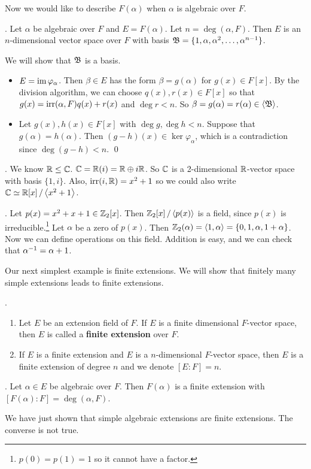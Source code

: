 Now we would like to describe \(F(\alpha)\) when \(\alpha\) is algebraic over \(F\).

\thm. Let \(\alpha\) be algebraic over \(F\) and \(E = F(\alpha)\). Let \(n = \deg(\alpha, F)\). Then \(E\) is an \(n\)-dimensional vector space over \(F\) with basis \(\mathfrak{B} = \{1, \alpha, \alpha^2, \dots, \alpha^{n-1}\}\).

\pf We will show that \(\mathfrak{B}\) is a basis.
\begin{itemize}
    \item {} \(E = \operatorname{im} \varphi_\alpha\). Then \(\beta \in E\) has the form \(\beta = g(\alpha)\) for \(g(x) \in F[x]\). By the division algorithm, we can choose \(q(x), r(x) \in F[x]\) so that \(g(x) = \mathrm{irr}(\alpha, F) q(x) + r(x)\) and \(\deg r < n\). So \(\beta = g(\alpha) = r(\alpha) \in \left\langle \mathfrak{B} \right\rangle\).
    \item {} Let \(g(x), h(x) \in F[x]\) with \(\deg g, \deg h < n\). Suppose that \(g(\alpha) = h(\alpha)\). Then \((g-h)(x) \in \ker \varphi_\alpha\), which is a contradiction since \(\deg (g-h) < n\). \qed
\end{itemize}

\pagebreak

\ex. We know \(\mathbb{R} \leq \mathbb{C}\). \(\mathbb{C} = \mathbb{R}(i) = \mathbb{R} \oplus i\mathbb{R}\). So \(\mathbb{C}\) is a 2-dimensional \(\mathbb{R}\)-vector space with basis \(\{1, i\}\). Also, \(\mathrm{irr}(i, \mathbb{R}) = x^2 + 1\) so we could also write \(\mathbb{C} \simeq \mathbb{R}[x] \operatorname{/} \left\langle x^2 + 1 \right\rangle\).

\ex. Let \(p(x) = x^2 + x + 1 \in \mathbb{Z}_2[x]\). Then \(\mathbb{Z}_2[x] \operatorname{/} \left\langle p(x) \right\rangle\) is a field, since \(p(x)\) is irreducible.\footnote{\(p(0) = p(1) = 1\) so it cannot have a factor.} Let \(\alpha\) be a zero of \(p(x)\). Then \(\mathbb{Z}_2(\alpha) = \left\langle 1, \alpha \right\rangle = \left\{0, 1, \alpha, 1 + \alpha\right\}\). Now we can define operations on this field. Addition is easy, and we can check that \(\alpha^{-1} = \alpha + 1\).

\setcounter{topic}{30}

Our next simplest example is finite extensions. We will show that finitely many simple extensions leads to finite extensions.

. 
\begin{enumerate}
    \item Let \(E\) be an extension field of \(F\). If \(E\) is a finite dimensional \(F\)-vector space, then \(E\) is called a \textbf{finite extension} over \(F\).

    \item If \(E\) is a finite extension and \(E\) is a \(n\)-dimensional \(F\)-vector space, then \(E\) is a finite extension of degree \(n\) and we denote \([E : F] = n\).
\end{enumerate}

\cor. Let \(\alpha \in E\) be algebraic over \(F\). Then \(F(\alpha)\) is a finite extension with \([F(\alpha) : F] = \deg(\alpha, F)\).

We have just shown that simple algebraic extensions are finite extensions. The converse is not true.

\pagebreak
